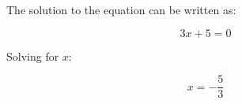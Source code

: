 \documentclass{article}
\begin{document}
The solution to the equation can be written as:

\[
3x + 5 = 0
\]

Solving for \(x\):

\[
x = -\frac{5}{3}
\]
\end{document}
